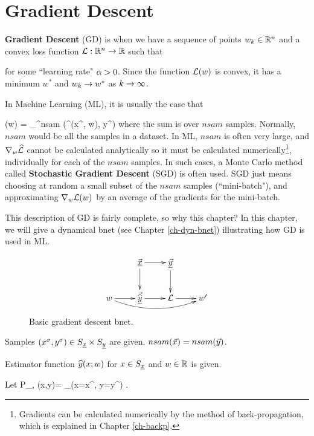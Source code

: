 \chapter{Gradient Descent}
\label{ch-gradient-descent}


{\bf Gradient Descent} (GD) is when we have a sequence of points $w_k\in{ \mathbb{R}}^n$ and a convex loss function ${\cal L}:{ \mathbb{R}}^n\rightarrow { \mathbb{R}}$ such that

\beq
{}
\label{eq-grad-descent}
\eeq
for some ``learning rate" $\alpha>0$.
Since the function ${\cal L}(w)$ is convex, 
it has a minimum $w^*$ and $w_k\rightarrow w^*$
as $k\rightarrow \infty$.

In Machine Learning (ML), it
is usually the case that

\beq
\call(w) = \sum_{}^{nsam}
\HAT{\call}(\haty^\s(x^\s, w), y^\s)
\eeq
where the sum is over $nsam$ samples. Normally, $nsam$ would be 
all the samples in a dataset.
In ML, $nsam$ is often very large, 
and $\nabla_w{\widehat{{\cal L}}} $ cannot
be calculated analytically so it must be calculated numerically\footnote{Gradients can 
be calculated numerically 
by the method of
back-propagation, which is explained in Chapter \ref{ch-backp}.},
individually for each of the $nsam$ samples. In such cases,
a Monte Carlo method called {\bf Stochastic Gradient Descent} (SGD)
is often used. 
SGD just means choosing at random
a small subset of the $nsam$ samples (``mini-batch"), and 
approximating $\nabla_w{\cal L}(w)$ by
an average of the gradients for the mini-batch.

This description of GD is fairly complete, so why this chapter? In this chapter, we will 
give a dynamical bnet (see Chapter \ref{ch-dyn-bnet}) illustrating how GD is used in ML.

\begin{figure}[h!]
\centering
$$\xymatrix{
&\vec{\rvx}\ar[d]\ar[r]&\ul{\vecy}
\ar[d]&\\
w\ar[r]\ar@/_1pc/[rrr]&
\vec{\HAT{\rvy}}\ar[r]&\call\ar[r]&w'
}$$
\caption{Basic gradient descent bnet.}
\label{fig-bfit}
\end{figure}


Samples 
$(x^\sigma, y^\sigma)\in S_{\underline{x}}\times S_{\underline{y}}$
are given. $nsam({\vec{x}})=nsam({\vec{y}})$.

Estimator function 
${\widehat{y}}(x; w)$
for $x\in S_{\underline{x}}$ and $w\in{ \mathbb{R}}$
is given.

Let 
\beq
P_{\rvx, \rvy}(x,y)=
\sum_\s \indi(x=x^\s, y=y^\s)
\;.
\eeq


